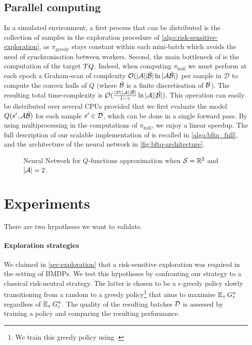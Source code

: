 \subsection{Parallel computing}
\label{subsec:parallel-computing}
In a simulated environment, a first process that can be distributed is the collection of samples in the exploration procedure of \autoref{algo:risk-sensitive-exploration}, as $\pi_\text{greedy}$ stays constant within each mini-batch which avoids the need of synchronisation between workers. Second, the main bottleneck of \BFTQ is the computation of the target $\mathcal{T} Q$. Indeed, when computing $\pi_\text{hull}$ we must perform at each epoch a Graham-scan of complexity $\mathcal{O}(|\mathcal{A}||\tilde{\mathcal{B}}| \ln |\mathcal{A}\tilde{\mathcal{B}}|)$ per sample in $\mathcal{D}$ to compute the convex hulls of $Q$ (where $\tilde{\mathcal{B}}$ is a finite discretisation of $\mathcal{B}$). The resulting total time-complexity is $\mathcal{O}(\frac{|\mathcal{D}||\mathcal{A}||\tilde{\mathcal{B}}|}{1-\gamma} \ln |\mathcal{A}||\tilde{\mathcal{B}}|)$. This operation can easily be distributed over several CPUs provided that we first evaluate the model $Q(s',\mathcal{A}\tilde{\mathcal{B}})$ for each sample $s'\in\mathcal{D}$, which can be done in a single forward pass. By using multiprocessing in the computations of $\pi_\text{hull}$, we enjoy a linear speedup.
The full description of our scalable implementation of \BFTQ is recalled in \autoref{algo:bftq_full}, and the architecture of the neural network in  \autoref{fig:bftq-architecture}.


\begin{figure}[tp]
	\centering
	
	\caption{Neural Network for $Q$-functions approximation when $\mathcal{S}=\mathbb{R}^2$ and $|\mathcal{A}| = 2$.}
	\label{fig:bftq-architecture}
\end{figure}




\section{Experiments}
\label{sec:brl-experiments}
There are two hypotheses we want to validate.

\paragraph{Exploration strategies}\label{par:ex-explo} We claimed in \autoref{sec:exploration} that a risk-sensitive exploration was required in the setting of BMDPs. We test this hypotheses by confronting our strategy to a classical risk-neutral strategy. The latter is chosen to be a $\epsilon$-greedy policy slowly transitioning from a random to a greedy policy\footnote{We train this greedy policy using \FTQ.} that aims to maximise $\operatorname*{\mathbb{E}}_{\pi} G_r^\pi$ regardless of $\operatorname*{\mathbb{E}}_{\pi} G_c^\pi$. The quality of the resulting batches $\mathcal{D}$ is assessed by training a \BFTQ policy and comparing the resulting performance.

